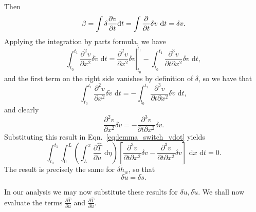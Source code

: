 Then
\begin{equation}
\beta = \int \delta\frac{\partial v}{\partial t}\text dt = \int\frac{\partial}{\partial t} \delta v\text{ d}t = \delta v.
\end{equation}
Applying the integration by parts formula, we have
\begin{equation}
\int_{t_0}^{t_1}\frac{\partial^2 v}{\partial x^2}\delta \dot v\text{ d}t = \left.\frac{\partial^2v}{\partial x^2}\delta v\right|_{t_0}^{t_1} - \int_{t_0}^{t_1}\frac{\partial^3 v}{\partial t\partial x^2}\delta v\text{ d}t,
\end{equation}
and the first term on the right side vanishes by definition of $\delta$, so we have that 
\begin{equation}
\int_{t_0}^{t_1}\frac{\partial^2 v}{\partial x^2}\delta \dot v\text{ d}t =- \int_{t_0}^{t_1}\frac{\partial^3 v}{\partial t\partial x^2}\delta v\text{ d}t,
\end{equation}
and clearly
\begin{equation}
\frac{\partial^2 v}{\partial x^2}\delta \dot v=-\frac{\partial^3 v}{\partial t\partial x^2}\delta v.
\end{equation}
Substituting this result in Eqn.~\ref{eq:lemma_switch_vdot} yields
\begin{equation}
\int_{t_0}^{t_1}\int_0^L\left(\int_L^x\frac{\partial\hat T}{\partial \dot u}\text{ d}\eta\right)\left[\frac{\partial^3v}{\partial t\partial x^2}\delta v-\frac{\partial^3v}{\partial t\partial x^2}\delta v\right]\text{ d}x\text{ d}t = 0.
\end{equation}
The result is precisely the same for $\delta\dot h_w$, so that 
\begin{equation}
\delta\dot u = \delta\dot s.
\end{equation}

In our analysis we may now substitute these results for $\delta u,\delta\dot u$. We shall now evaluate the terms $\frac{\partial \hat T}{\partial u}$ and $\frac{\partial \hat T}{\partial \dot u}$.

